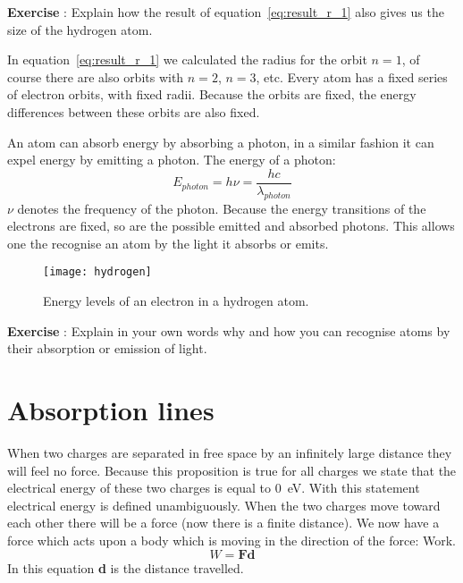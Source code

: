\begin{shaded} \textbf{Exercise \theExercise {}} : Explain how the result of equation~\ref{eq:result_r_1} also gives us the size of the hydrogen atom.\end{shaded}

In equation~\ref{eq:result_r_1} we calculated the radius for the orbit $n=1$, of course there are also orbits with $n=2$, $n=3$, etc. Every atom has a fixed series of electron orbits, with fixed radii. Because the orbits are fixed, the energy differences between these orbits are also fixed.

An atom can absorb energy by absorbing a photon, in a similar fashion it can expel energy by emitting a photon. The energy of a photon:
\begin{equation}
E_{photon} = h\nu = \frac{hc}{\lambda_{photon}} \label{eq:E_photon}
\end{equation}
$\nu$ denotes the frequency of the photon. Because the energy transitions of the electrons are fixed, so are the possible emitted and absorbed photons. This allows one the recognise an atom by the light it absorbs or emits.

\begin{figure}\begin{center}
\texttt{[image: hydrogen]}
\caption{Energy levels of an electron in a hydrogen atom.}\label{fig:shower_angles}
\end{center}\end{figure}

\begin{shaded} \textbf{Exercise \theExercise {}} : Explain in your own words why and how you can recognise atoms by their absorption or emission of light. \end{shaded}

\section{Absorption lines}
When two charges are separated in free space by an infinitely large distance they will feel no force. Because this proposition is true for all charges we state that the electrical energy of these two charges is equal to 0~eV. With this statement electrical energy is defined unambiguously.
When the two charges move toward each other there will be a force (now there is a finite distance). We now have a force which acts upon a body which is moving in the direction of the force: Work.
\begin{equation}
W = \textbf{F} \textbf{d}  \label{eq:work}
\end{equation}
In this equation \textbf{d} is the distance travelled.

